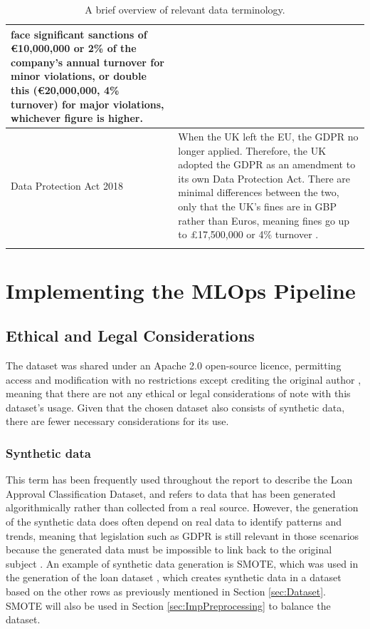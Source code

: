 \documentclass[12pt]{report}
\begin{document}
\begin{longtable}{ | p{} | p{} |}
    face significant sanctions of \euro10,000,000 or 2\% of the company's annual turnover for minor violations, or double this (\euro20,000,000, 4\% turnover)
    for major violations, whichever figure is higher. \\
    \hline
    Data Protection Act 2018 & When the UK left the EU, the GDPR no longer applied. Therefore, the UK adopted the GDPR as an amendment to its own
    Data Protection Act. There are minimal differences between the two, only that the UK's fines are in GBP rather than Euros, meaning fines go up 
    to \pounds17,500,000 or 4\% turnover \autocite{ico_enforcement_2024}. \\
    \hline
\caption{A brief overview of relevant data terminology.}\label{tab:dataTerms}
\end{longtable}


\chapter{Implementing the MLOps Pipeline}
\section{Ethical and Legal Considerations}
The dataset was shared under an Apache 2.0 open-source licence, permitting access and modification with no restrictions
except crediting the original author \autocite{apache_apache_nodate}, meaning that there are not any ethical or legal 
considerations of note with this dataset's usage. Given that the chosen dataset also consists of synthetic data,
there are fewer necessary considerations for its use.

\subsection{Synthetic data}
This term has been frequently used throughout the report to describe the Loan Approval Classification Dataset, and refers to 
data that has been generated algorithmically rather than collected from a real source. However, the generation of the 
synthetic data does often depend on real data to identify patterns and trends, meaning that legislation such as GDPR is still relevant
in those scenarios because the generated data must be impossible to link back to the original subject \autocite{Lopez2022OnTL}.
An example of synthetic data generation is SMOTE, which was used in the generation of the loan dataset \autocite{zoppelleto_financial_nodate}, 
which creates synthetic data in a dataset based on the other rows as previously mentioned in Section \ref{sec:Dataset}. SMOTE will also be used in Section 
\ref{sec:ImpPreprocessing} to balance the dataset.
\end{document}
